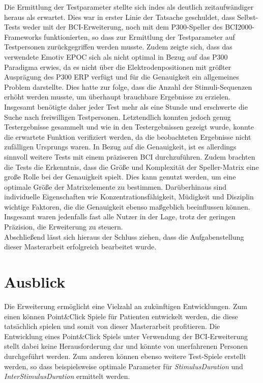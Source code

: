 Die Ermittlung der Testparameter stellte sich indes als deutlich zeitaufwändiger heraus als erwartet.
Dies war in erster Linie der Tatsache geschuldet, dass Selbst-Tests weder mit der \acs{BCI}-Erweiterung, noch mit dem P300-Speller des BCI2000-Frameworks funktionierten,
so dass zur Ermittlung der Testparameter auf Testpersonen zurückgegriffen werden musste.
Zudem zeigte sich, dass das verwendete Emotiv EPOC sich als nicht optimal in Bezug auf das P300 Paradigma erwies, da es nicht über die Elektrodenpositionen mit größter Ausprägung des \acs{P300 ERP} verfügt 
und für die Genauigkeit ein allgemeines Problem darstellte.
Dies hatte zur folge, dass die Anzahl der Stimuli-Sequenzen erhöht werden musste, um überhaupt brauchbare Ergebnisse zu erzielen.
Insgesamt benötigte daher jeder Test mehr als eine Stunde und erschwerte die Suche nach freiwilligen Testpersonen.
Letztendlich konnten jedoch genug Testergebnisse gesammelt 
und wie in den Testergebnissen gezeigt wurde, konnte die erwartete Funktion verifiziert werden, da die beobachteten Ergebnisse nicht zufälligen Ursprungs waren.
In Bezug auf die Genauigkeit, ist es allerdings sinnvoll weitere Tests mit einem präziseren \acs{BCI} durchzuführen.
Zudem brachten die Tests die Erkenntnis, dass die Größe und Komplexität der Speller-Matrix eine große Rolle bei der Genauigkeit spielt.
Dies kann genutzt werden, um eine optimale Größe der Matrixelemente zu bestimmen.
Darüberhinaus sind individuelle Eigenschaften wie Konzentrationsfähigkeit, Müdigkeit und Disziplin wichtige Faktoren, die die Genauigkeit ebenso maßgeblich beeinflussen können.
Insgesamt waren jedenfalls fast alle Nutzer in der Lage, trotz der geringen Präzision, die Erweiterung zu steuern.\\
Abschließend lässt sich hieraus der Schluss ziehen, dass die Aufgabenstellung dieser Masterarbeit erfolgreich bearbeitet wurde.\\









\pagebreak
\section{Ausblick}

Die Erweiterung ermöglicht eine Vielzahl an zukünftigen Entwicklungen. 
Zum einen können Point\&Click Spiele für Patienten entwickelt werden, die diese tatsächlich spielen und somit von dieser Masterarbeit profitieren. 
Die Entwicklung eines Point\&Click Spiels unter Verwendung der \acs{BCI}-Erweiterung stellt dabei keine Herausforderung dar und könnte von unerfahrenen Personen durchgeführt werden.
Zum anderen können ebenso weitere Test-Spiele erstellt werden, so dass beispielsweise optimale Parameter für \textit{StimulusDuration} und \textit{InterStimulusDuration} ermittelt werden.\\

